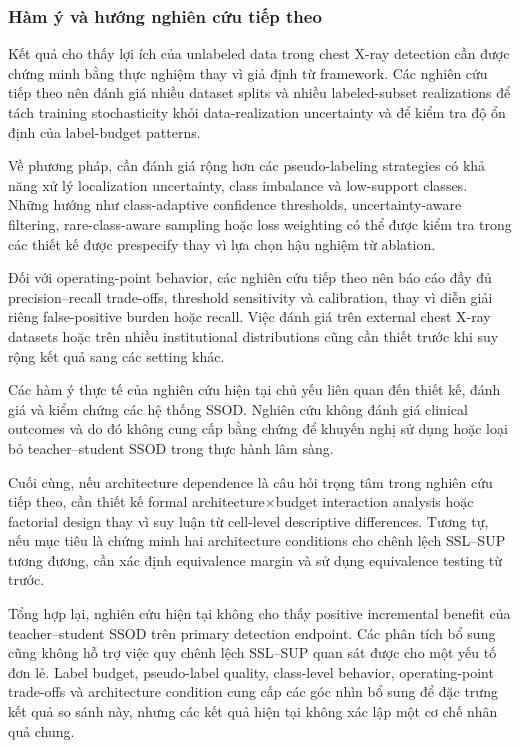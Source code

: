 \documentclass[pdflatex,sn-mathphys-num]{sn-jnl}%
\theoremstyle{thmstyleone}%
\theoremstyle{thmstyletwo}%
\theoremstyle{thmstylethree}%
\begin{document}
\subsubsection{Hàm ý và hướng nghiên cứu tiếp theo}

Kết quả cho thấy lợi ích của unlabeled data trong chest X-ray detection cần được chứng minh bằng thực nghiệm thay vì giả định từ framework. Các nghiên cứu tiếp theo nên đánh giá nhiều dataset splits và nhiều labeled-subset realizations để tách training stochasticity khỏi data-realization uncertainty và để kiểm tra độ ổn định của label-budget patterns.

Về phương pháp, cần đánh giá rộng hơn các pseudo-labeling strategies có khả năng xử lý localization uncertainty, class imbalance và low-support classes. Những hướng như class-adaptive confidence thresholds, uncertainty-aware filtering, rare-class-aware sampling hoặc loss weighting có thể được kiểm tra trong các thiết kế được prespecify thay vì lựa chọn hậu nghiệm từ ablation.

Đối với operating-point behavior, các nghiên cứu tiếp theo nên báo cáo đầy đủ
precision--recall trade-offs, threshold sensitivity và calibration, thay vì
diễn giải riêng false-positive burden hoặc recall. Việc đánh giá trên external
chest X-ray datasets hoặc trên nhiều institutional distributions cũng cần thiết
trước khi suy rộng kết quả sang các setting khác.

Các hàm ý thực tế của nghiên cứu hiện tại chủ yếu liên quan đến thiết kế,
đánh giá và kiểm chứng các hệ thống SSOD. Nghiên cứu không đánh giá clinical
outcomes và do đó không cung cấp bằng chứng để khuyến nghị sử dụng hoặc loại bỏ
teacher--student SSOD trong thực hành lâm sàng.

Cuối cùng, nếu architecture dependence là câu hỏi trọng tâm trong nghiên cứu tiếp theo, cần thiết kế formal architecture$\times$budget interaction analysis hoặc factorial design thay vì suy luận từ cell-level descriptive differences. Tương tự, nếu mục tiêu là chứng minh hai architecture conditions cho chênh lệch SSL--SUP tương đương, cần xác định equivalence margin và sử dụng equivalence testing từ trước.

Tổng hợp lại, nghiên cứu hiện tại không cho thấy positive incremental benefit
của teacher--student SSOD trên primary detection endpoint. Các phân tích bổ
sung cũng không hỗ trợ việc quy chênh lệch SSL--SUP quan sát được cho một yếu tố
đơn lẻ. Label budget, pseudo-label quality, class-level behavior,
operating-point trade-offs và architecture condition cung cấp các góc nhìn
bổ sung để đặc trưng kết quả so sánh này, nhưng các kết quả hiện tại không xác lập
một cơ chế nhân quả chung.
\end{document}
